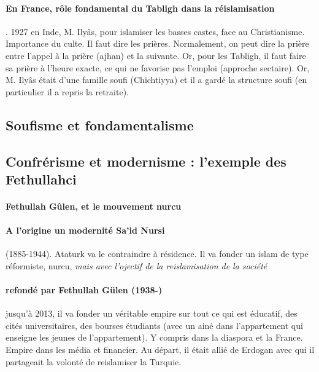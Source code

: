 \paragraph{En France, rôle fondamental du Tabligh dans la réislamisation}.  1927 en Inde, M. Ilyâs, pour islamiser les basses castes, face au Christianisme. Importance du culte. Il faut dire les prières. Normalement, on peut dire la prière entre l'appel à la prière (ajhan) et la suivante. Or, pour les Tabligh, il faut faire sa prière à l'heure exacte, ce qui ne favorise pas l'emploi (approche sectaire).  Or, M. Ilyâs était d'une famille soufi (Chichtiyya) et il a gardé la structure soufi (en particulier il a repris la retraite).


\subsection{Soufisme et fondamentalisme}

\subsection{Confrérisme et modernisme : l'exemple des Fethullahci}
 
 
 
\paragraph{Fethullah Gûlen, et le mouvement nurcu}

\paragraph{A l'origine un modernité Sa'id Nursi} (1885-1944). Ataturk va le contraindre à résidence. Il va fonder un islam de type réformiste, nurcu, \textit{mais avec l'ojectif de la reislamisation de la société}

\paragraph{refondé par Fethullah Gülen (1938-)} jusqu'à 2013, il va fonder un véritable empire sur tout ce qui est éducatif, des cités universitaires, des bourses étudiants (avec un ainé dans l'appartement qui enseigne les jeunes de l'appartement). Y compris dans la diaspora et la France.
Empire dans les média et financier.  Au départ, il était allié de Erdogan avec qui il partageait la volonté de reislamiser la Turquie.

